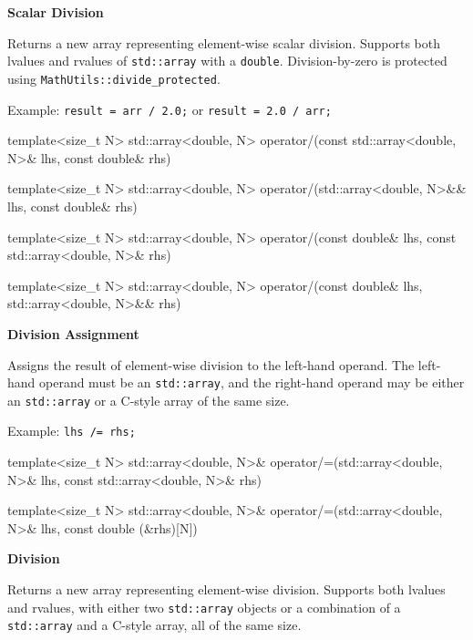 \documentclass[11pt,fleqn]{report}
\begin{document}
\textbf{Scalar Division}  

Returns a new array representing element-wise scalar division.  
Supports both lvalues and rvalues of \texttt{std::array} with a \texttt{double}.
Division-by-zero is protected using \texttt{MathUtils::divide\_protected}.  

Example: \texttt{result = arr / 2.0;} or \texttt{result = 2.0 / arr;}  
\begin{code}
template<size_t N>
std::array<double, N> operator/(const std::array<double, N>& lhs, 
                                const double& rhs)

template<size_t N>
std::array<double, N> operator/(std::array<double, N>&& lhs, 
                                const double& rhs)

template<size_t N>
std::array<double, N> operator/(const double& lhs, 
                                const std::array<double, N>& rhs)

template<size_t N>
std::array<double, N> operator/(const double& lhs, 
                                std::array<double, N>&& rhs)
\end{code}

\textbf{Division Assignment}  

Assigns the result of element-wise division to the left-hand operand.
The left-hand operand must be an \texttt{std::array}, and the right-hand 
operand may be either an \texttt{std::array} or a C-style array 
of the same size.

Example: \texttt{lhs /= rhs;}  
\begin{code}
template<size_t N>
std::array<double, N>& operator/=(std::array<double, N>& lhs, 
                                  const std::array<double, N>& rhs)

template<size_t N>
std::array<double, N>& operator/=(std::array<double, N>& lhs, 
                                  const double (&rhs)[N])
\end{code}

\textbf{Division}  

Returns a new array representing element-wise division.  
Supports both lvalues and rvalues, with either two \texttt{std::array} objects or
a combination of a \texttt{std::array} and a C-style array, all of the same size.
\end{document}
